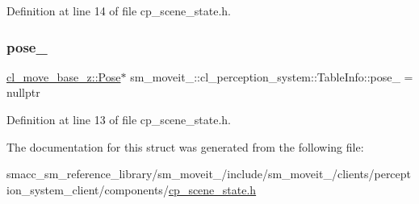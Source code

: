 Definition at line 14 of file cp\+\_\+scene\+\_\+state.\+h.

\mbox{\label{structsm__moveit__4_1_1cl__perception__system_1_1TableInfo_a937c9bb7e6d237080c816d7e369d0caf}} 
\subsubsection{\texorpdfstring{pose\+\_\+}{pose\_}}
{\footnotesize\ttfamily \hyperlink{classcl__move__base__z_1_1Pose}{cl\+\_\+move\+\_\+base\+\_\+z\+::\+Pose}$\ast$ sm\+\_\+moveit\+\_\+::cl\+\_\+perception\+\_\+system\+::\+Table\+Info\+::pose\+\_\+ = nullptr}



Definition at line 13 of file cp\+\_\+scene\+\_\+state.\+h.



The documentation for this struct was generated from the following file\+:\begin{DoxyCompactItemize}
\item 
smacc\+\_\+sm\+\_\+reference\+\_\+library/sm\+\_\+moveit\+\_/include/sm\+\_\+moveit\+\_/clients/perception\+\_\+system\+\_\+client/components/\hyperlink{cp__scene__state_8h}{cp\+\_\+scene\+\_\+state.\+h}\end{DoxyCompactItemize}
